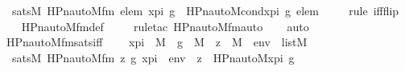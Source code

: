 \begin{isabellebody}
\ \ sats{\isacharparenleft}{\kern0pt}M{\isacharcomma}{\kern0pt}\ HPn{\isacharunderscore}{\kern0pt}auto{\isacharunderscore}{\kern0pt}M{\isacharunderscore}{\kern0pt}fm{\isacharcomma}{\kern0pt}\ {\isacharbrackleft}{\kern0pt}elem{\isacharcomma}{\kern0pt}\ x{\isacharunderscore}{\kern0pt}pi{\isacharcomma}{\kern0pt}\ g{\isacharbrackright}{\kern0pt}{\isacharparenright}{\kern0pt}\ {\isasymlongleftrightarrow}\ HPn{\isacharunderscore}{\kern0pt}auto{\isacharunderscore}{\kern0pt}M{\isacharunderscore}{\kern0pt}cond{\isacharparenleft}{\kern0pt}x{\isacharunderscore}{\kern0pt}pi{\isacharcomma}{\kern0pt}\ g{\isacharcomma}{\kern0pt}\ elem{\isacharparenright}{\kern0pt}{\isachardoublequoteclose}\ \isanewline
%
\isadelimproof
\ \ %
\endisadelimproof
%
\isatagproof
{}\isamarkupfalse%
\ {\isacharparenleft}{\kern0pt}rule\ iff{\isacharunderscore}{\kern0pt}flip{\isacharparenright}{\kern0pt}\ \isanewline
\ \ \isamarkupfalse%
\ HPn{\isacharunderscore}{\kern0pt}auto{\isacharunderscore}{\kern0pt}M{\isacharunderscore}{\kern0pt}fm{\isacharunderscore}{\kern0pt}def\ \isanewline
\ \ \isamarkupfalse%
\ {\isacharparenleft}{\kern0pt}rule{\isacharunderscore}{\kern0pt}tac\ HPn{\isacharunderscore}{\kern0pt}auto{\isacharunderscore}{\kern0pt}M{\isacharunderscore}{\kern0pt}fm{\isacharunderscore}{\kern0pt}auto{\isacharparenright}{\kern0pt}\isanewline
\ \ \isamarkupfalse%
\ auto%
\endisatagproof
{\isafoldproof}%
%
\isadelimproof
\isanewline
%
\endisadelimproof
\isanewline
{}\isamarkupfalse%
\ HPn{\isacharunderscore}{\kern0pt}auto{\isacharunderscore}{\kern0pt}M{\isacharunderscore}{\kern0pt}fm{\isacharprime}{\kern0pt}{\isacharunderscore}{\kern0pt}sats{\isacharunderscore}{\kern0pt}iff\ {\isacharcolon}{\kern0pt}\ \isanewline
\ \ {\isachardoublequoteopen}x{\isacharunderscore}{\kern0pt}pi\ {\isasymin}\ M\ {\isasymLongrightarrow}\ g\ {\isasymin}\ M\ {\isasymLongrightarrow}\ z\ {\isasymin}\ M\ {\isasymLongrightarrow}\ env\ {\isasymin}\ list{\isacharparenleft}{\kern0pt}M{\isacharparenright}{\kern0pt}\ {\isasymLongrightarrow}\ \isanewline
\ \ sats{\isacharparenleft}{\kern0pt}M{\isacharcomma}{\kern0pt}\ HPn{\isacharunderscore}{\kern0pt}auto{\isacharunderscore}{\kern0pt}M{\isacharunderscore}{\kern0pt}fm{\isacharprime}{\kern0pt}{\isacharcomma}{\kern0pt}\ {\isacharbrackleft}{\kern0pt}z{\isacharcomma}{\kern0pt}\ g{\isacharcomma}{\kern0pt}\ x{\isacharunderscore}{\kern0pt}pi{\isacharbrackright}{\kern0pt}\ {\isacharat}{\kern0pt}\ env{\isacharparenright}{\kern0pt}\ {\isasymlongleftrightarrow}\ z\ {\isacharequal}{\kern0pt}\ HPn{\isacharunderscore}{\kern0pt}auto{\isacharunderscore}{\kern0pt}M{\isacharparenleft}{\kern0pt}x{\isacharunderscore}{\kern0pt}pi{\isacharcomma}{\kern0pt}\ g{\isacharparenright}{\kern0pt}{\isachardoublequoteclose}\ \isanewline

\end{isabellebody}
